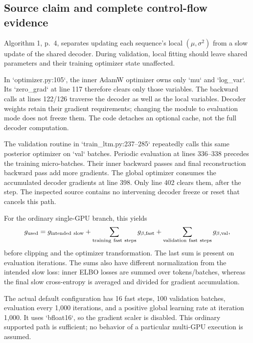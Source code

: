 \documentclass[10pt]{article}
\begin{document}
\subsection*{Source claim and complete control-flow evidence}
Algorithm 1, p. 4, separates updating each sequence’s local \((\mu,\sigma^2)\) from a slow update of the shared decoder. During validation, local fitting should leave shared parameters and their training optimizer state unaffected.\par
In `optimizer.py:105`, the inner AdamW optimizer owns only `mu` and `log\_var`. Its `zero\_grad` at line 117 therefore clears only those variables. The backward calls at lines 122/126 traverse the decoder as well as the local variables. Decoder weights retain their gradient requirements; changing the module to evaluation mode does not freeze them. The code detaches an optional cache, not the full decoder computation.\par
The validation routine in `train\_ltm.py:237--285` repeatedly calls this same posterior optimizer on `val` batches. Periodic evaluation at lines 336–338 precedes the training micro-batches. Their inner backward passes and final reconstruction backward pass add more gradients. The global optimizer consumes the accumulated decoder gradients at line 398. Only line 402 clears them, after the step. The inspected source contains no intervening decoder freeze or reset that cancels this path.\par
For the ordinary single-GPU branch, this yields \[g_{\rm used}
 =g_{\rm intended\ slow}
  +\sum_{\rm training\ fast\ steps}g_{\beta,{\rm fast}}
  +\sum_{\rm validation\ fast\ steps}g_{\beta,{\rm val}},\] before clipping and the optimizer transformation. The last sum is present on evaluation iterations. The sums also have different normalization from the intended slow loss: inner ELBO losses are summed over tokens/batches, whereas the final slow cross-entropy is averaged and divided for gradient accumulation.\par
The actual default configuration has 16 fast steps, 100 validation batches, evaluation every 1,000 iterations, and a positive global learning rate at iteration 1,000. It uses `bfloat16`, so the gradient scaler is disabled. This ordinary supported path is sufficient; no behavior of a particular multi-GPU execution is assumed.\par
\end{document}
